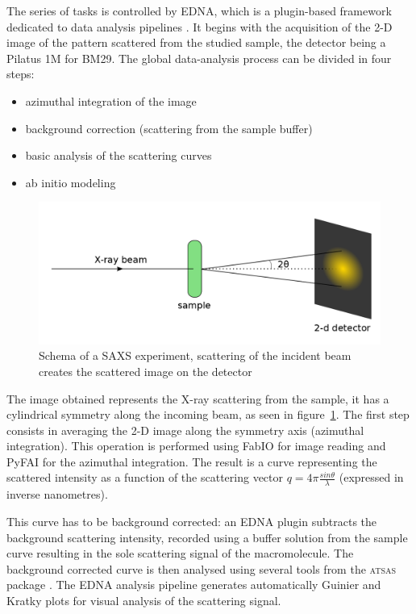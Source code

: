 \documentclass[a4paper, 11pt]{report}
\begin{document}
The series of tasks is controlled by EDNA, which is a plugin-based 
framework dedicated to data analysis pipelines \cite{edna}. 
It begins with the acquisition of the 2-D image of the pattern 
scattered from the studied sample, the detector being a Pilatus 1M for 
BM29. 
The global data-analysis process can be divided in four steps: 
\begin{itemize}
 \item azimuthal integration of the image
 \item background correction (scattering from the sample buffer)
 \item basic analysis of the scattering curves
 \item ab initio modeling
\end{itemize}

\begin{figure}
\centering
\includegraphics[scale=0.3]{schemaSAXS.png}
\caption{Schema of a SAXS experiment, scattering of the incident beam 
    creates the scattered image on the detector}
\label{fgr:schemaSAXS}
\end{figure}

The image obtained represents the X-ray scattering from the sample, it 
has a cylindrical symmetry along the incoming beam, as seen in 
figure~\ref{fgr:schemaSAXS}. 
The first step consists in averaging the 2-D image along the 
symmetry axis (azimuthal integration).  
This operation is performed using FabIO \cite{fabio} for image reading 
and PyFAI \cite{pyFAI} for the azimuthal integration. 
The result is a curve representing the scattered intensity as a 
function of the scattering vector $q = 4 \pi \frac{sin\theta}{\lambda}$ 
(expressed in inverse nanometres).

This curve has to be background corrected: an EDNA plugin subtracts the
background scattering intensity, recorded using a buffer
solution from the sample curve resulting in the sole scattering signal 
of the macromolecule. 
The background corrected curve is then analysed using several tools 
from the \textsc{atsas} package \cite{atsas}. 
The EDNA analysis pipeline generates automatically Guinier and Kratky
plots for visual analysis of the scattering signal.\\
\end{document}
